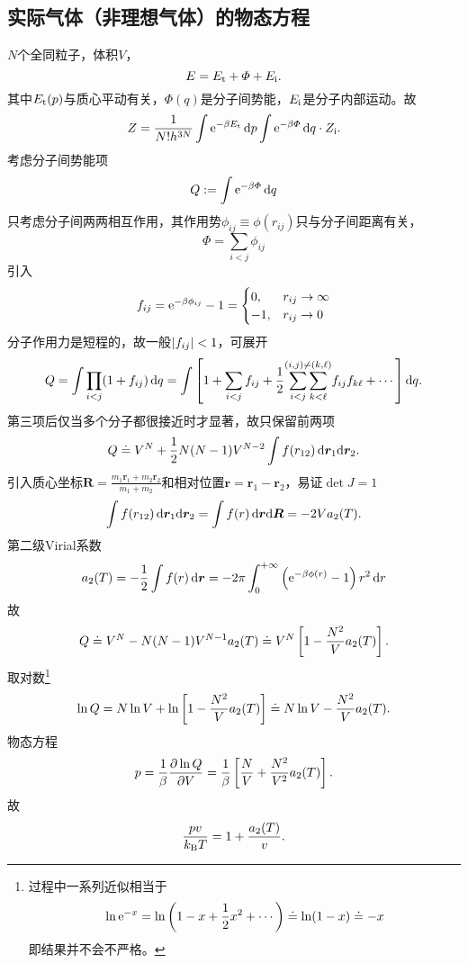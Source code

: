 \subsection[实际气体的物态方程]{实际气体（非理想气体）的物态方程}
$N$个全同粒子，体积$V$，
\[
	E=E_\mathrm t+\varPhi+E_{\mathrm{i}}.
\]
其中$E_\mathrm t(p)$与质心平动有关，$\varPhi(q)$是分子间势能，$E_{\mathrm{i}}$是分子内部运动。故
\[
	Z=\frac1{N!h^{3N}}\int\mathop{}\!\mathrm{e}^{-\beta E_\mathrm t}\mathop{}\!\mathrm{d} p\int\mathop{}\!\mathrm{e}^{-\beta\varPhi}\mathop{}\!\mathrm{d} q\cdot Z_{\mathrm{i}}.
\]
考虑分子间势能项
\[
	Q:=\int\mathop{}\!\mathrm{e}^{-\beta\varPhi}\mathop{}\!\mathrm{d} q
\]
只考虑分子间两两相互作用，其作用势$\phi_{ij}\equiv\phi(r_{ij})$只与分子间距离有关，
\[
	\varPhi=\sum_{i<j}\phi_{ij}
\]
引入
\[
	f_{ij}=\mathop{}\!\mathrm{e}^{-\beta\phi_{ij}}-1=
	\begin{cases}
		0,&r_{ij}\to\infty\\
		-1,&r_{ij}\to0
	\end{cases}
\]
分子作用力是短程的，故一般$\left\lvert f_{ij}\right\rvert<1$，可展开
\[
	Q=\int\prod_{i<j}(1+f_{ij})\mathop{}\!\mathrm{d} q=\int\left[1+\sum_{i<j}f_{ij}+\frac12\overset{(i,j)\neq(k,\ell)}{\sum_{i<j}\sum_{k<\ell}}f_{ij}f_{k\ell}+\cdots\right]\mathop{}\!\mathrm{d} q.
\]
第三项后仅当多个分子都很接近时才显著，故只保留前两项
\[
	Q\doteq V^N+\frac12N(N-1)V^{N-2}\int f(r_{12})\mathop{}\!\mathrm{d}\bm r_1\mathrm{d}\bm r_2.
\]
引入质心坐标$\bm R=\frac{m_1\bm r_1+m_2\bm r_2}{m_1+m_2}$和相对位置$\bm r=\bm r_1-\bm r_2$，易证$\det J=1$
\[
	\int f(r_{12})\mathop{}\!\mathrm{d}\bm r_1\mathrm{d}\bm r_2=\int f(r)\mathop{}\!\mathrm{d}\bm r\mathrm{d}\bm R=-2Va_2(T).
\]
第二级Virial系数
\begin{align}
	a_2(T)=-\frac12\int f(r)\mathop{}\!\mathrm{d}\bm r=-2\pi\int_0^{+\infty}\left(\mathop{}\!\mathrm{e}^{-\beta\phi(r)}-1\right)r^2\mathop{}\!\mathrm{d} r
\end{align}
故
\[
	Q\doteq V^N-N(N-1)V^{N-1}a_2(T)\doteq V^N\left[1-\frac{N^2}Va_2(T)\right].
\]
取对数\footnote{过程中一系列近似相当于
\[
	\ln\mathop{}\!\mathrm{e}^{-x}=\ln\left(1-x+\frac12x^2+\cdots\right)\doteq\ln(1-x)\doteq -x
\]
即结果并不会不严格。}
\begin{align}
	\ln Q=N\ln V+\ln\left[1-\frac{N^2}Va_2(T)\right]\doteq N\ln V-\frac{N^2}Va_2(T).
\end{align}
物态方程
\begin{align*}
	p=\frac1\beta\frac{\partial^{\;\!\!}\ln Q}{\partial V^{\;\!\!}}=\frac1\beta\left[\frac NV+\frac{N^2}{V^2}a_2(T)\right].
\end{align*}
故
\begin{align}
	\frac{pv}{k_{\mathrm B} T}=1+\frac{a_2(T)}v.
\end{align}
